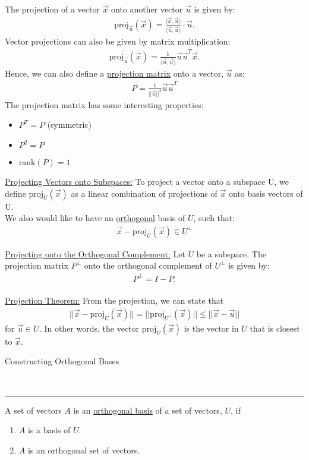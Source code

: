 \documentclass{article}
\newcommand{\header}[1]{\begin{large}\noindent #1\end{large}\\\rule{\textwidth}{0.5pt}}
\newcommand{\gap}{\medskip\\}
\newcommand{\sheader}[1]{\underline{#1:}}
\newcommand{\proj}[2]{{}\textrm{proj}_{#1}\left(#2\right)}}
\begin{document}
The projection of a vector $\vec{x}$ onto another vector $\vec{u}$ 
is given by:
\begin{align*}
    \textrm{proj}_{\vec{u}}(\vec{x}) = \frac{\langle \vec{x}, \vec{u}\rangle}{\langle \vec{u}, \vec{u}\rangle} \cdot \vec{u}.
\end{align*}
Vector projections can also be given by matrix multiplication:
\begin{align*}
    \textrm{proj}_{\vec{u}}(\vec{x}) = \frac{1}{\langle \vec{u}, \vec{u}\rangle} \vec{u}\vec{u}^T \vec{x}.
\end{align*}
Hence, we can also define a \underline{projection matrix} onto a 
vector, $\vec{u}$ as:
\begin{align*}
    P = \frac{1}{||\vec{u}||^2} \vec{u}\vec{u}^T
\end{align*}
The projection matrix has some interesting properties:
\begin{itemize}
    \item $P^T = P$ (symmetric)
    \item $P^2 = P$
    \item $\textrm{rank}(P) = 1$
\end{itemize}
\sheader{Projecting Vectors onto Subspaces} To project a vector onto
a subspace U, we define $\textrm{proj}_U(\vec{x})$ as a linear 
combination of projections of $\vec{x}$ onto basis vectors of U.
\gap
We also would like to have an \underline{orthogonal} basis of $U$,
such that:
\begin{align*}
    \vec{x} - \textrm{proj}_U(\vec{x}) \in U^\perp
\end{align*}

\sheader{Projecting onto the Orthogonal Complement}
Let $U$ be a subspace. The projection matrix $P^\perp$ onto the 
orthogonal complement of $U^\perp$ is given by:
\begin{align*}
    P^\perp = I - P.
\end{align*}
\gap
\sheader{Projection Theorem} From the projection, we can state that
\begin{align*}
    ||\vec{x} - \proj{U}{\vec{x}} || = ||\proj{U^\perp}{\vec{x}}||  \leq ||\vec{x} - \vec{u}||
\end{align*}
for $\vec{u} \in U$. In other words, the vector $\proj{U}{\vec{x}}$
is the vector in $U$ that is closest to $\vec{x}$.
\gap
\header{Constructing Orthogonal Bases}
A set of vectors $A$ is an \underline{orthogonal basis} of a set of vectors,
$U$, if 
\begin{enumerate}
    \item $A$ is a basis of $U$.
    \item $A$ is an orthogonal set of vectors.
\end{enumerate}
\end{document}
